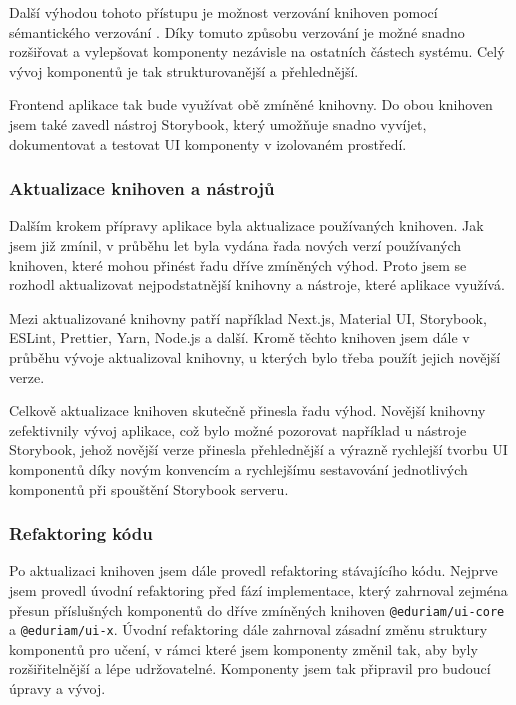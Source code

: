 Další výhodou tohoto přístupu je možnost verzování knihoven pomocí sémantického verzování \cite{SemVer}. Díky tomuto způsobu verzování je možné snadno rozšiřovat a vylepšovat komponenty nezávisle na ostatních částech systému. Celý vývoj komponentů je tak strukturovanější a přehlednější.

Frontend aplikace tak bude využívat obě zmíněné knihovny. Do obou knihoven jsem také zavedl nástroj Storybook, který umožňuje snadno vyvíjet, dokumentovat a testovat UI komponenty v izolovaném prostředí.

\subsubsection{Aktualizace knihoven a nástrojů}

Dalším krokem přípravy aplikace byla aktualizace používaných knihoven. Jak jsem již zmínil, v průběhu let byla vydána řada nových verzí používaných knihoven, které mohou přinést řadu dříve zmíněných výhod. Proto jsem se rozhodl aktualizovat nejpodstatnější knihovny a nástroje, které aplikace využívá.

Mezi aktualizované knihovny patří například Next.js, Material UI, Storybook, ESLint, Prettier, Yarn, Node.js a další. Kromě těchto knihoven jsem dále v průběhu vývoje aktualizoval knihovny, u kterých bylo třeba použít jejich novější verze.

Celkově aktualizace knihoven skutečně přinesla řadu výhod. Novější knihovny zefektivnily vývoj aplikace, což bylo možné pozorovat například u nástroje Storybook, jehož novější verze přinesla přehlednější a výrazně rychlejší tvorbu UI komponentů díky novým konvencím a rychlejšímu sestavování jednotlivých komponentů při spouštění Storybook serveru.

\subsubsection{Refaktoring kódu}

Po aktualizaci knihoven jsem dále provedl refaktoring stávajícího kódu. Nejprve jsem provedl úvodní refaktoring před fází implementace, který zahrnoval zejména přesun příslušných komponentů do dříve zmíněných knihoven \texttt{@eduriam/ui-core} a \texttt{@eduriam/ui-x}. Úvodní refaktoring dále zahrnoval zásadní změnu struktury komponentů pro učení, v rámci které jsem komponenty změnil tak, aby byly rozšiřitelnější a lépe udržovatelné. Komponenty jsem tak připravil pro budoucí úpravy a vývoj.

